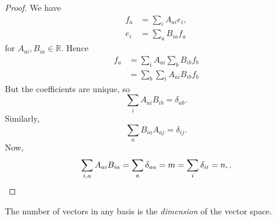 \documentclass[10pt]{article}
\begin{document}
    \begin{proof}
        We have 
        \[
            \begin{aligned}
                 f_a&= \sum_{i}A_{ai}e_i,\\ 
                 e_i&= \sum_{a}B_{ia}f_a
            \end{aligned}
        \]
        for $ A_{ai},B_{ia}\in \mathbb{R} $.
        Hence
        \[
            \begin{aligned}
                f_a&=\sum_{i}A_{ai}\sum_{b}B_{ib}f_{b}\\
                &= \sum_{b}\sum_{i}A_{ai}B_{ib}f_b
            \end{aligned}
        \]
        But the coefficients are unique, so 
        \[
            \sum_{i}A_{ai}B_{ib}=\delta_{ab}
        .\]
        Similarly,
        \[
            \sum_{a}B_{ia}A_{aj}=\delta_{ij}
        .\]
        Now, 
        \[
            \sum_{i,a}A_{ai}B_{ia}=\sum_{a} \delta_{aa}=m = \sum_{i}\delta_{ii}=n,\\
        .\]
    \end{proof}
    \begin{definition}
        The number of vectors in any basis is the \textit{dimension} of the vector space.
    \end{definition}
\end{document}
